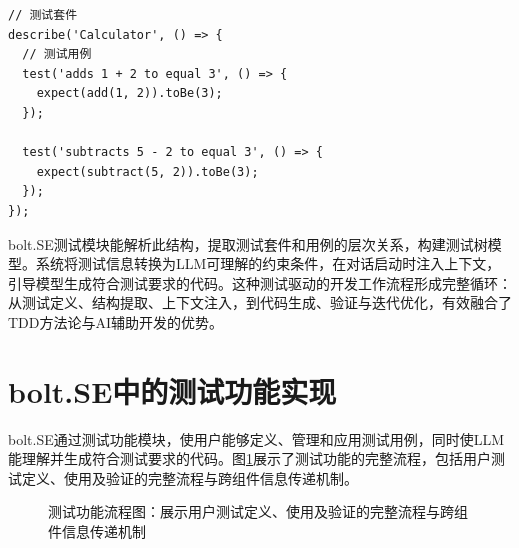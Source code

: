 \begin{verbatim}
// 测试套件
describe('Calculator', () => {
  // 测试用例
  test('adds 1 + 2 to equal 3', () => {
    expect(add(1, 2)).toBe(3);
  });
  
  test('subtracts 5 - 2 to equal 3', () => {
    expect(subtract(5, 2)).toBe(3);
  });
});
\end{verbatim}

bolt.SE测试模块能解析此结构，提取测试套件和用例的层次关系，构建测试树模型。系统将测试信息转换为LLM可理解的约束条件，在对话启动时注入上下文，引导模型生成符合测试要求的代码。这种测试驱动的开发工作流程形成完整循环：从测试定义、结构提取、上下文注入，到代码生成、验证与迭代优化，有效融合了TDD方法论与AI辅助开发的优势。

\section{bolt.SE中的测试功能实现}

bolt.SE通过测试功能模块，使用户能够定义、管理和应用测试用例，同时使LLM能理解并生成符合测试要求的代码。图\ref{fig:test_sequence}展示了测试功能的完整流程，包括用户测试定义、使用及验证的完整流程与跨组件信息传递机制。

\begin{figure}[H]
  \centering
  \caption{测试功能流程图：展示用户测试定义、使用及验证的完整流程与跨组件信息传递机制}
  \label{fig:test_sequence}
\end{figure}

